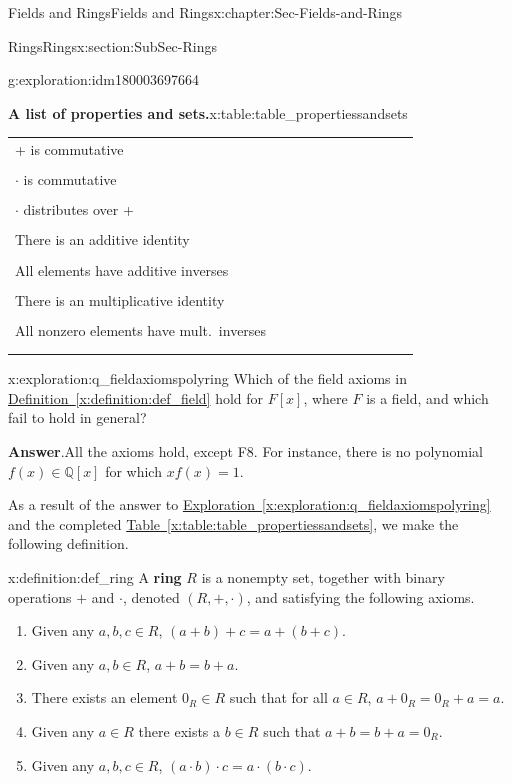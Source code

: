 \documentclass[oneside,10pt,]{book}
\newcommand{\blocktitlefont}{\relax}
\newcommand{\xreffont}{\relax}
\newcommand{\terminology}[1]{\textbf{#1}}
\numberwithin{equation}{section}
\newcommand{\hrulethin}  {\noalign{\hrule height 0.04em}}
\def\Q{{\mathbb Q}}
\begin{document}
\begin{chapterptx}{Fields and Rings}{}{Fields and Rings}{}{}{x:chapter:Sec-Fields-and-Rings}
\begin{sectionptx}{Rings}{}{Rings}{}{}{x:section:SubSec-Rings}
\begin{exploration}{}{g:exploration:idm180003697664}
\begin{tableptx}{\textbf{A list of properties and sets.}}{x:table:table_propertiessandsets}{}
{\begin{tabular}{lllllllllll}
+ is commutative&&&&&&&&&&\tabularnewline[0pt]
&&&&&&&&&&\tabularnewline\hrulethin
\(\cdot\) is commutative&&&&&&&&&&\tabularnewline[0pt]
&&&&&&&&&&\tabularnewline\hrulethin
\(\cdot\) distributes over +&&&&&&&&&&\tabularnewline[0pt]
&&&&&&&&&&\tabularnewline\hrulethin
There is an additive identity&&&&&&&&&&\tabularnewline[0pt]
&&&&&&&&&&\tabularnewline\hrulethin
All elements have additive inverses&&&&&&&&&&\tabularnewline[0pt]
&&&&&&&&&&\tabularnewline\hrulethin
There is an multiplicative identity&&&&&&&&&&\tabularnewline[0pt]
&&&&&&&&&&\tabularnewline\hrulethin
All nonzero elements have mult.~inverses&&&&&&&&&&\tabularnewline[0pt]
&&&&&&&&&&\tabularnewline\hrulethin
\end{tabular}
}%
\end{tableptx}%
\end{exploration}
\begin{exploration}{}{x:exploration:q_fieldaxiomspolyring}%
Which of the field axioms in \hyperref[x:definition:def_field]{Definition~{\xreffont\ref{x:definition:def_field}}} hold for \(F[x]\), where \(F\) is a field, and which fail to hold in general?%
\par\smallskip%
\noindent\textbf{\blocktitlefont Answer}.\hypertarget{g:answer:idm180003189456}{}\quad{}All the axioms hold, except F8. For instance, there is no polynomial \(f(x)\in \Q[x]\) for which \(x f(x) = 1\).%
\end{exploration}
As a result of the answer to \hyperref[x:exploration:q_fieldaxiomspolyring]{Exploration~{\xreffont\ref{x:exploration:q_fieldaxiomspolyring}}} and the completed \hyperref[x:table:table_propertiessandsets]{Table~{\xreffont\ref{x:table:table_propertiessandsets}}}, we make the following definition.%
\begin{definition}{}{x:definition:def_ring}%
%
A \terminology{ring} \(R\) is a nonempty set, together with binary operations \(+\) and \(\cdot\), denoted \((R,+,\cdot)\), and satisfying the following axioms.%
\begin{enumerate}
\item{}Given any \(a,b,c\in R\), \((a+b)+c = a+(b+c)\).%
\item{}Given any \(a,b\in R\), \(a+b= b+a\).%
\item{}There exists an element \(0_R\in R\) such that for all \(a\in R\), \(a+0_R = 0_R + a = a\).%
\item{}Given any \(a\in R\) there exists a \(b\in R\) such that \(a+b = b + a =0_R\).%
\item{}Given any \(a,b,c\in R\), \((a\cdot b)\cdot c = a\cdot (b\cdot c)\).%

\end{enumerate}
\end{definition}
\end{sectionptx}
\end{chapterptx}
\end{document}
